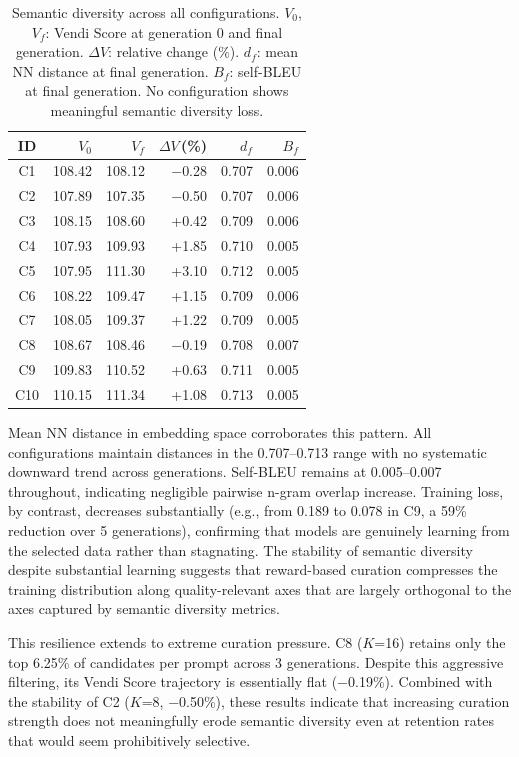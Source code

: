 \documentclass[11pt,a4paper]{article}
\begin{document}
\begin{table}[t]
\centering
\caption{Semantic diversity across all configurations. $V_0$, $V_f$: Vendi Score at generation 0 and final generation. $\Delta V$: relative change (\%). $d_f$: mean NN distance at final generation. $B_f$: self-BLEU at final generation. No configuration shows meaningful semantic diversity loss.}
\label{tab:semantic}
\footnotesize
\begin{tabular}{crrrrr}
\toprule
ID & $V_0$ & $V_f$ & $\Delta V$\,(\%) & $d_f$ & $B_f$ \\
\midrule
C1 & 108.42 & 108.12 & $-$0.28 & 0.707 & 0.006 \\
C2 & 107.89 & 107.35 & $-$0.50 & 0.707 & 0.006 \\
C3 & 108.15 & 108.60 & +0.42 & 0.709 & 0.006 \\
C4 & 107.93 & 109.93 & +1.85 & 0.710 & 0.005 \\
C5 & 107.95 & 111.30 & +3.10 & 0.712 & 0.005 \\
C6 & 108.22 & 109.47 & +1.15 & 0.709 & 0.006 \\
C7 & 108.05 & 109.37 & +1.22 & 0.709 & 0.005 \\
C8 & 108.67 & 108.46 & $-$0.19 & 0.708 & 0.007 \\
\midrule
C9 & 109.83 & 110.52 & +0.63 & 0.711 & 0.005 \\
C10 & 110.15 & 111.34 & +1.08 & 0.713 & 0.005 \\
\bottomrule
\end{tabular}
\end{table}

Mean NN distance in embedding space corroborates this pattern. All configurations maintain distances in the 0.707--0.713 range with no systematic downward trend across generations. Self-BLEU remains at 0.005--0.007 throughout, indicating negligible pairwise n-gram overlap increase. Training loss, by contrast, decreases substantially (e.g., from 0.189 to 0.078 in C9, a 59\% reduction over 5 generations), confirming that models are genuinely learning from the selected data rather than stagnating. The stability of semantic diversity despite substantial learning suggests that reward-based curation compresses the training distribution along quality-relevant axes that are largely orthogonal to the axes captured by semantic diversity metrics.

This resilience extends to extreme curation pressure. C8 ($K$=16) retains only the top 6.25\% of candidates per prompt across 3 generations. Despite this aggressive filtering, its Vendi Score trajectory is essentially flat ($-$0.19\%). Combined with the stability of C2 ($K$=8, $-$0.50\%), these results indicate that increasing curation strength does not meaningfully erode semantic diversity even at retention rates that would seem prohibitively selective.
\end{document}
